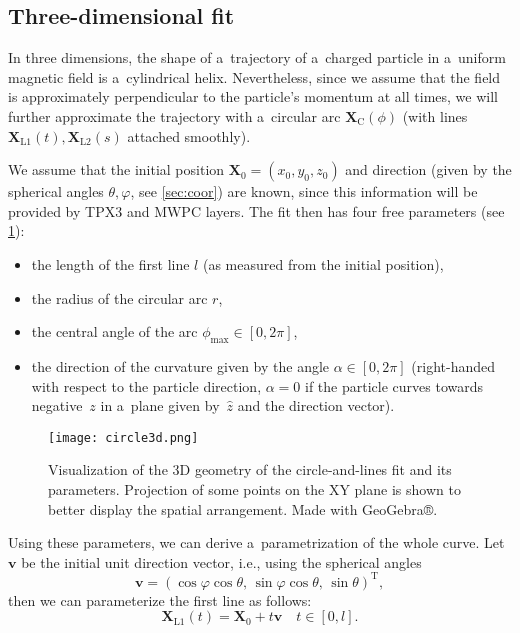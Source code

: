 		\subsection{Three-dimensional fit}
			In three dimensions, the shape of a~trajectory of a~charged particle in a~uniform magnetic field is a~cylindrical helix. Nevertheless, since we assume that the field is approximately perpendicular to the particle's momentum at all times, we will further approximate the trajectory with a~circular arc $\mathbf{X}_\text{C}(\phi)$ (with lines $\mathbf{X}_\text{L1}(t),\mathbf{X}_\text{L2}(s)$ attached smoothly).
			
			We assume that the initial position $\mathbf{X}_0 = (x_0,y_0,z_0)$ and direction (given by the spherical angles $\theta,\varphi$, see \cref{sec:coor}) are known, since this information will be provided by \ac{TPX3} and \ac{MWPC} layers. The fit then has four free parameters (see \cref{fig:circle3d}):
				\begin{itemize}[nosep]
					\item the length of the first line $l$ (as measured from the initial position),
					\item the radius of the circular arc $r$,
					\item the central angle of the arc $\phi_\text{max} \in [0,2\pi]$,
					\item the direction of the curvature given by the angle $\alpha \in [0,2\pi]$ (right-handed with respect to the particle direction, $\alpha = 0$ if the particle curves towards negative~$z$ in a~plane given by~$\hat{z}$ and the direction vector).
				\end{itemize}
			\begin{figure}
				\centering
				\texttt{[image: circle3d.png]}
				\caption{Visualization of the 3D geometry of the circle-and-lines fit and its parameters. Projection of some points on the XY plane is shown to better display the spatial arrangement. Made with GeoGebra®.}
				\label{fig:circle3d}
			\end{figure}
			Using these parameters, we can derive a~parametrization of the whole curve. Let $\mathbf{v}$ be the initial unit direction vector, i.e., using the spherical angles
				\begin{equation}
					\mathbf{v} = (\cos\varphi\cos\theta, \,\sin\varphi\cos\theta, \,\sin\theta)^\mathrm{T},
				\end{equation}
			then we can parameterize the first line as follows:
				\begin{equation}
					\mathbf{X}_\text{L1}(t) = \mathbf{X}_0 + t\mathbf{v} \quad t\in[0,l].
				\end{equation}
